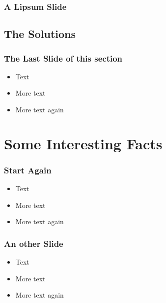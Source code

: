 \begin{frame}
\frametitle{A Lipsum Slide}
  \lipsum[4]
\end{frame}

\subsection{The Solutions}

\begin{frame} 
\frametitle{The Last Slide of this section}
  \begin{itemize}
  \item Text
  \item More text
  \item More text again
  \end{itemize}
\end{frame}

\section{Some Interesting Facts}

\begin{frame} 
\frametitle{Start Again}
  \begin{itemize}
  \item Text
  \item More text
  \item More text again
  \end{itemize}
\end{frame}


\begin{frame} 
\frametitle{An other Slide}
  \begin{itemize}
  \item Text
  \item More text
  \item More text again
  \end{itemize}
\end{frame}


